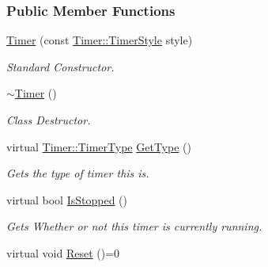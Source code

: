 \subsubsection*{Public Member Functions}
\begin{DoxyCompactItemize}
\item 
\hyperlink{classMezzanine_1_1Timer_af93b23ec9bdd7f88a5d333029edb00d1}{Timer} (const \hyperlink{classMezzanine_1_1Timer_a1db436d4e0d6f1676e41ba3cb2ea3aaa}{Timer::TimerStyle} style)
\begin{DoxyCompactList}\small\item\em Standard Constructor. \item\end{DoxyCompactList}\item 
\hypertarget{classMezzanine_1_1Timer_af9f53c261429f22eaf09ae9d86e8b931}{
\hyperlink{classMezzanine_1_1Timer_af9f53c261429f22eaf09ae9d86e8b931}{$\sim$Timer} ()}
\label{classMezzanine_1_1Timer_af9f53c261429f22eaf09ae9d86e8b931}

\begin{DoxyCompactList}\small\item\em Class Destructor. \item\end{DoxyCompactList}\item 
virtual \hyperlink{classMezzanine_1_1Timer_afdc9cac008cfe642ce8a11d090f29ec6}{Timer::TimerType} \hyperlink{classMezzanine_1_1Timer_a58083b89492615c5aab7d32caa151d7b}{GetType} ()
\begin{DoxyCompactList}\small\item\em Gets the type of timer this is. \item\end{DoxyCompactList}\item 
\hypertarget{classMezzanine_1_1Timer_ae9234cbfc7a02fb2130bbf4bb790c27d}{
virtual bool \hyperlink{classMezzanine_1_1Timer_ae9234cbfc7a02fb2130bbf4bb790c27d}{IsStopped} ()}
\label{classMezzanine_1_1Timer_ae9234cbfc7a02fb2130bbf4bb790c27d}

\begin{DoxyCompactList}\small\item\em Gets Whether or not this timer is currently running. \item\end{DoxyCompactList}\item 
\hypertarget{classMezzanine_1_1Timer_a40bfabc6c9b213cc3d98e96d029fae98}{
virtual void \hyperlink{classMezzanine_1_1Timer_a40bfabc6c9b213cc3d98e96d029fae98}{Reset} ()=0}
\label{classMezzanine_1_1Timer_a40bfabc6c9b213cc3d98e96d029fae98}


\end{DoxyCompactItemize}
